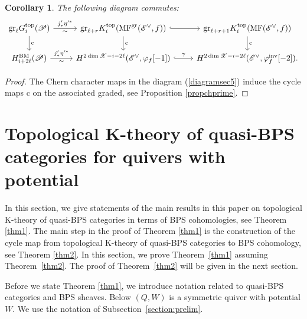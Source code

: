 \documentclass [11pt,oneside,a4paper,mathscr]{amsart}
\newtheorem{cor}[thm]{Corollary}
\theoremstyle{definition}
\begin{document}
\begin{cor}\label{prop53}
The following diagram commutes:
\begin{equation*}
    \begin{tikzcd}
        \mathrm{gr}_\ell G^{\mathrm{top}}_i(\mathscr{P})\arrow[d, "\mathrm{c}"]\arrow[r, "\sim"', "j'_*\eta'^*"]& \mathrm{gr}_{\ell+r} K^{\mathrm{top}}_i(\mathrm{MF}^{\mathrm{gr}}(\mathscr{E}^\vee, f))\arrow[d, "\mathrm{c}"]\arrow[r, hook]& \mathrm{gr}_{\ell+r+1} K^{\mathrm{top}}_i(\mathrm{MF}(\mathscr{E}^\vee, f))\arrow[d, "\mathrm{c}"]\\
        H^{\mathrm{BM}}_{i+2\ell}(\mathscr{P})\arrow[r, "\sim"', "j'_*\eta'^*"]& H^{2\dim \mathscr{X}-i-2\ell}(\mathscr{E}^\vee, \varphi_f[-1])\arrow[r, hook, "\gamma"]& H^{2\dim \mathscr{X}-i-2\ell}(\mathscr{E}^\vee, \varphi_f^{\mathrm{inv}}[-2]).
    \end{tikzcd}
\end{equation*}
\end{cor}


\begin{proof}
The Chern character maps in the diagram (\ref{diagramsec5}) induce the cycle maps $\mathrm{c}$ on the associated graded, see Proposition \ref{propchprime}. 
\end{proof}
















\section{Topological K-theory of quasi-BPS categories for quivers with potential}\label{s6}

In this section, we 
give statements of the main results in this paper
on
topological K-theory of quasi-BPS categories
in terms of BPS cohomologies, see Theorem \ref{thm1}. The main step in the proof of Theorem \ref{thm1} is the construction of the cycle map from topological K-theory of quasi-BPS categories to BPS cohomology, see Theorem \ref{thm2}. 
In this section, we prove Theorem~\ref{thm1} 
assuming Theorem~\ref{thm2}. 
The proof of Theorem~\ref{thm2} will be given 
in the next section. 


Before we state Theorem \ref{thm1}, we introduce notation related to quasi-BPS categories and BPS sheaves. 
Below $(Q, W)$ is a symmetric quiver with
potential $W$. 
We use the notation of Subsection~\ref{section:prelim}.
\end{document}
